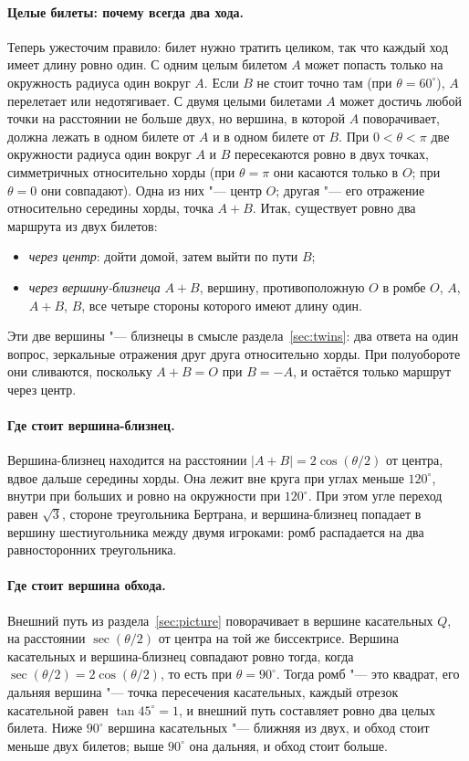 \paragraph{Целые билеты: почему всегда два хода.} Теперь ужесточим правило: билет
нужно тратить целиком, так что каждый ход имеет длину ровно один. С одним целым билетом $A$
может попасть только на окружность радиуса один вокруг $A$. Если $B$ не стоит точно там
(при $\theta=60^\circ$), $A$ перелетает или недотягивает. С двумя целыми билетами $A$ может
достичь любой точки на расстоянии не больше двух, но вершина, в которой $A$ поворачивает, должна лежать в одном билете
от $A$ и в одном билете от $B$. При $0<\theta<\pi$ две окружности радиуса один вокруг $A$ и $B$ пересекаются ровно
в двух точках, симметричных относительно хорды (при $\theta=\pi$ они касаются только в $O$; при
$\theta=0$ они совпадают). Одна из них "--- центр $O$; другая "--- его
отражение относительно середины хорды, точка $A+B$. Итак, существует ровно два
маршрута из двух билетов:
\begin{itemize}
  \item \emph{через центр}: дойти домой, затем выйти по пути $B$;
  \item \emph{через вершину-близнеца} $A+B$, вершину, противоположную $O$ в ромбе
    $O$, $A$, $A+B$, $B$, все четыре стороны которого имеют длину один.
\end{itemize}
Эти две вершины "--- близнецы в смысле раздела~\ref{sec:twins}: два ответа на один
вопрос, зеркальные отражения друг друга относительно хорды. При полуобороте они сливаются, поскольку $A+B=O$
при $B=-A$, и остаётся только маршрут через центр.

\paragraph{Где стоит вершина-близнец.} Вершина-близнец находится на расстоянии
$|A+B|=2\cos(\theta/2)$ от центра, вдвое дальше середины хорды. Она
лежит вне круга при углах меньше $120^\circ$, внутри при больших и ровно на окружности при
$120^\circ$. При этом угле переход равен $\sqrt3$, стороне треугольника Бертрана, и
вершина-близнец попадает в вершину шестиугольника между двумя игроками: ромб распадается
на два равносторонних треугольника.

\paragraph{Где стоит вершина обхода.} Внешний путь из раздела~\ref{sec:picture}
поворачивает в вершине касательных $Q$, на расстоянии $\sec(\theta/2)$ от центра на той же
биссектрисе. Вершина касательных и вершина-близнец совпадают ровно тогда, когда
$\sec(\theta/2)=2\cos(\theta/2)$, то есть при $\theta=90^\circ$. Тогда ромб "--- это
квадрат, его дальняя вершина "--- точка пересечения касательных, каждый отрезок касательной равен $\tan45^\circ=1$,
и внешний путь составляет ровно два целых билета. Ниже $90^\circ$ вершина касательных "---
ближняя из двух, и обход стоит меньше двух билетов; выше $90^\circ$ она
дальняя, и обход стоит больше.

